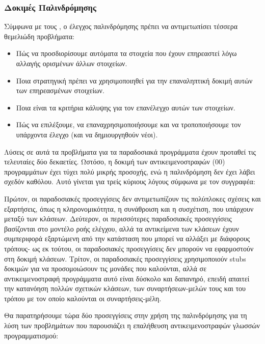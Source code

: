 \documentclass[12pt]{article}
\begin{document}
\subsubsection{Δοκιμές Παλινδρόμησης}

Σύμφωνα με τους \textcite{kung}, ο έλεγχος παλινδρόμησης πρέπει να αντιμετωπίσει τέσσερα θεμελιώδη προβλήματα:

\begin{itemize}
\item Πώς να προσδιορίσουμε αυτόματα τα στοιχεία που έχουν επηρεαστεί λόγω αλλαγής ορισμένων άλλων στοιχείων.
\item Ποια στρατηγική πρέπει να χρησιμοποιηθεί για την επαναληπτική δοκιμή αυτών των επηρεασμένων στοιχείων.
\item Ποια είναι τα κριτήρια κάλυψης για τον επανέλεγχο αυτών των στοιχείων.
\item Πώς να επιλέξουμε, να επαναχρησιμοποιήσουμε και να τροποποιήσουμε τον υπάρχοντα έλεγχο (και να δημιουργηθούν νέοι).
\end{itemize} 


\par Λύσεις σε αυτά τα προβλήματα για τα παραδοσιακά προγράμματα έχουν προταθεί τις τελευταίες δύο δεκαετίες. Ωστόσο, η δοκιμή των αντικειμενοστραφών (00) προγραμμάτων έχει τύχει πολύ μικρής προσοχής, ενώ η παλινδρόμηση δεν έχει λάβει σχεδόν καθόλου. Αυτό γίνεται για τρείς κύριους λόγους σύμφωνα με τον συγγραφέα:

\par Πρώτον, οι παραδοσιακές προσεγγίσεις δεν αντιμετωπίζουν τις πολύπλοκες σχέσεις και εξαρτήσεις, όπως η κληρονομικότητα, η συνάθροιση και η συσχέτιση, που υπάρχουν μεταξύ των κλάσεων. Δεύτερον, οι περισσότερες παραδοσιακές προσεγγίσεις βασίζονται στο μοντέλο ροής ελέγχου, αλλά τα αντικείμενα των κλάσεων έχουν συμπεριφορά εξαρτώμενη από την κατάσταση που μπορεί να αλλάξει με διάφορους τρόπους- ως εκ τούτου, οι παραδοσιακές προσεγγίσεις δεν μπορούν να εφαρμοστούν στη δοκιμή κλάσεων. Τρίτον, οι παραδοσιακές προσεγγίσεις χρησιμοποιούν stubs δοκιμών για να προσομοιώσουν τις μονάδες που καλούνται, αλλά σε αντικειμενοστραφή προγράμματα αυτό είναι δύσκολο και δαπανηρό, επειδή απαιτεί την κατανόηση πολλών σχετικών κλάσεων, των συναρτήσεων-μελών τους και του τρόπου με τον οποίο καλούνται οι συναρτήσεις-μέλη.

\par Θα παρατηρήσουμε τώρα δύο προσεγγίσεις στην χρήση της παλινδρόμησης για τη λύση των προβλημάτων που παρουσιάζει η επαλήθευση αντικειμενοστραφών γλωσσών προγραμματισμού:
\end{document}
